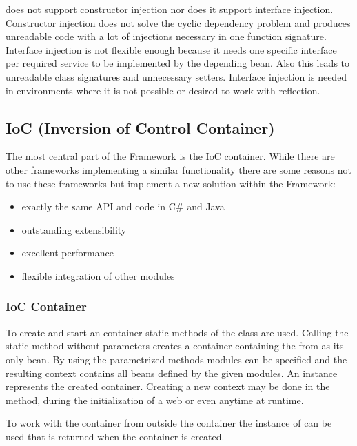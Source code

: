 \AMBETH{} does not support constructor injection nor does it support interface injection. Constructor injection does not solve the cyclic dependency problem and produces unreadable code with a lot of injections necessary in one function signature. Interface injection is not flexible enough because it needs one specific interface per required service to be implemented by the depending bean. Also this leads to unreadable class signatures and unnecessary setters. Interface injection is needed in environments where it is not possible or desired to work with reflection.

\subsection{IoC (Inversion of Control Container)}
The most central part of the \AMBETH{} Framework is the IoC container. While there are other frameworks implementing a similar functionality there are some reasons not to use these frameworks but implement a new solution within the \AMBETH{} Framework:

\begin{itemize}
	\item exactly the same API and code in C\# and Java
	\item outstanding extensibility
	\item excellent performance
	\item flexible integration of other \AMBETH{} modules
\end{itemize}

\subsubsection{IoC Container}
To create and start an \AMBETH{} container static methods of the class  are used. Calling the static method  without parameters creates a container containing the  from \AMBETH{} as its only bean. By using the parametrized methods modules can be specified and the resulting context contains all beans defined by the given modules. An instance  represents the created container.
Creating a new context may be done in the  method, during the initialization of a web  or even anytime at runtime.

To work with the container from outside the container the instance of  can be used that is returned when the container is created.

